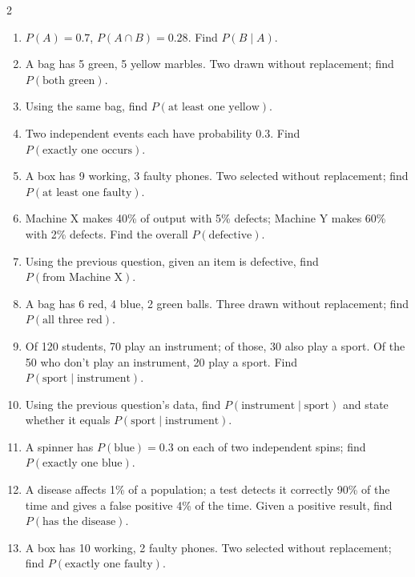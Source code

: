 \documentclass[11pt]{article}
\begin{document}
\begin{recapbox}
\begin{multicols}{2}
\small
\begin{enumerate}[leftmargin=*,itemsep=3pt]
  \item $P(A)=0.7$, $P(A\cap B)=0.28$. Find $P(B\mid A)$.
  \item A bag has 5 green, 5 yellow marbles. Two drawn without replacement; find $P(\text{both green})$.
  \item Using the same bag, find $P(\text{at least one yellow})$.
  \item Two independent events each have probability 0.3. Find $P(\text{exactly one occurs})$.
  \item A box has 9 working, 3 faulty phones. Two selected without replacement; find $P(\text{at least one faulty})$.
  \item Machine X makes 40\% of output with 5\% defects; Machine Y makes 60\% with 2\% defects. Find the overall $P(\text{defective})$.
  \item Using the previous question, given an item is defective, find $P(\text{from Machine X})$.
  \item A bag has 6 red, 4 blue, 2 green balls. Three drawn without replacement; find $P(\text{all three red})$.
  \item Of 120 students, 70 play an instrument; of those, 30 also play a sport. Of the 50 who don't play an instrument, 20 play a sport. Find $P(\text{sport}\mid\text{instrument})$.
  \item Using the previous question's data, find $P(\text{instrument}\mid\text{sport})$ and state whether it equals $P(\text{sport}\mid\text{instrument})$.
  \item A spinner has $P(\text{blue})=0.3$ on each of two independent spins; find $P(\text{exactly one blue})$.
  \item A disease affects 1\% of a population; a test detects it correctly 90\% of the time and gives a false positive 4\% of the time. Given a positive result, find $P(\text{has the disease})$.
  \item A box has 10 working, 2 faulty phones. Two selected without replacement; find $P(\text{exactly one faulty})$.
\end{enumerate}
\end{multicols}
\end{recapbox}
\end{document}
